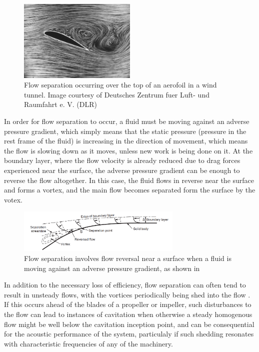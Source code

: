 \documentclass{article}\usepackage[]{graphicx}\usepackage[]{color}
\begin{document}
\begin{appendices}
\begin{figure}[h]
\captionsetup{width=0.5\textwidth}
\includegraphics[width=0.5\textwidth, center]{SeparatedAerofoil.jpg}
\caption{Flow separation occurring over the top of an aerofoil in a wind tunnel. Image courtesy of Deutsches Zentrum fuer Luft- und Raumfahrt e. V. (DLR)}
\label{fig:SeparatedAerofoil.jpg}
\end{figure}

In order for flow separation to occur, a fluid must be moving against an adverse pressure gradient, which simply means that the static pressure (pressure in the rest frame of the fluid) is increasing in the direction of movement, which means the flow is slowing down as it moves, unless new work is being done on it.  At the boundary layer, where the flow velocity is already reduced due to drag forces experienced near the surface, the adverse pressure gradient can be enough to reverse the flow altogether.  In this case, the fluid flows in reverse near the surface and forms a vortex, and the main flow becomes separated form the surface by the votex.

\begin{figure}[h]
\captionsetup{width=0.7\textwidth}
\includegraphics[width=0.7\textwidth, center]{FlowSeparation.png}
\caption{Flow separation involves flow reversal near a surface when a fluid is moving against an adverse pressure gradient, as shown in \parencite{mollard2011}}
\label{fig:FlowSeparation.png}
\end{figure}

In addition to the necessary loss of efficiency, flow separation can often tend to result in unsteady flows, with the vortices periodically being shed into the flow \parencite[480]{mollard2011}.  If this occurs ahead of the blades of a propeller or impeller, such disturbances to the flow can lead to instances of cavitation when otherwise a steady homogenous flow might be well below the cavitation inception point, and can be consequential for the acoustic performance of the system, particulaly if such shedding resonates with characteristic frequencies of any of the machinery.


\end{appendices}
\end{document}
